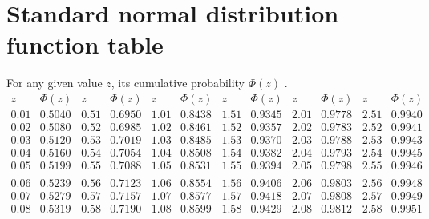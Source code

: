 \section{Standard normal distribution function table}\label{S:NormalDFTable}

{\scriptsize{
For any given value $z$, its cumulative probability $\Phi(z)$ .%
$$
 \begin{array}{|c|c|c|c|c|c|c|c|c|c|c|c|}\hline
z       &       \Phi(z) &       z       &       \Phi(z) &       z       &       \Phi(z) &       z       &       \Phi(z) &       z       &       \Phi(z) &       z       &       \Phi(z) \\ \hline
0.01    &       0.5040  &       0.51    &       0.6950  &       1.01    &       0.8438  &       1.51    &       0.9345  &       2.01    &       0.9778  &       2.51    &       0.9940  \\
0.02    &       0.5080  &       0.52    &       0.6985  &       1.02    &       0.8461  &       1.52    &       0.9357  &       2.02    &       0.9783  &       2.52    &       0.9941  \\
0.03    &       0.5120  &       0.53    &       0.7019  &       1.03    &       0.8485  &       1.53    &       0.9370  &       2.03    &       0.9788  &       2.53    &       0.9943  \\
0.04    &       0.5160  &       0.54    &       0.7054  &       1.04    &       0.8508  &       1.54    &       0.9382  &       2.04    &       0.9793  &       2.54    &       0.9945  \\
0.05    &       0.5199  &       0.55    &       0.7088  &       1.05    &       0.8531  &       1.55    &       0.9394  &       2.05    &       0.9798  &       2.55    &       0.9946  \\
&&&&&&&&&&&\\
0.06    &       0.5239  &       0.56    &       0.7123  &       1.06    &       0.8554  &       1.56    &       0.9406  &       2.06    &       0.9803  &       2.56    &       0.9948  \\
0.07    &       0.5279  &       0.57    &       0.7157  &       1.07    &       0.8577  &       1.57    &       0.9418  &       2.07    &       0.9808  &       2.57    &       0.9949  \\
0.08    &       0.5319  &       0.58    &       0.7190  &       1.08    &       0.8599  &       1.58    &       0.9429  &       2.08    &       0.9812  &       2.58    &       0.9951  \\

\end{array}$$}}
